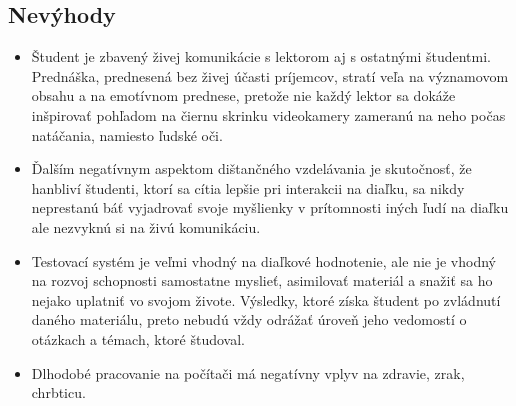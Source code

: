 \documentclass[10pt,oneside,slovak,a4paper]{article}
\begin{document}
\subsection{Nevýhody}
\begin{itemize}
	\item Študent je zbavený živej komunikácie s lektorom aj s ostatnými študentmi.
	Prednáška, prednesená bez živej účasti príjemcov, stratí veľa na významovom obsahu a na emotívnom prednese, pretože nie každý lektor sa dokáže inšpirovať pohľadom na čiernu skrinku videokamery zameranú na neho počas natáčania, namiesto ľudské oči.
	\item Ďalším negatívnym aspektom dištančného vzdelávania je skutočnosť, že hanbliví študenti, ktorí sa cítia lepšie pri interakcii na diaľku, sa nikdy neprestanú báť vyjadrovať svoje myšlienky v prítomnosti iných ľudí na diaľku ale nezvyknú si na živú komunikáciu.
	\item Testovací systém je veľmi vhodný na diaľkové hodnotenie, ale nie je vhodný na rozvoj schopnosti samostatne myslieť, asimilovať materiál a snažiť sa ho nejako uplatniť vo svojom živote.
	Výsledky, ktoré získa študent po zvládnutí daného materiálu, preto nebudú vždy odrážať úroveň jeho vedomostí o otázkach a témach, ktoré študoval.
	\item Dlhodobé pracovanie na počítači má negatívny vplyv na zdravie, zrak, chrbticu.
\end{itemize}











\end{document}
